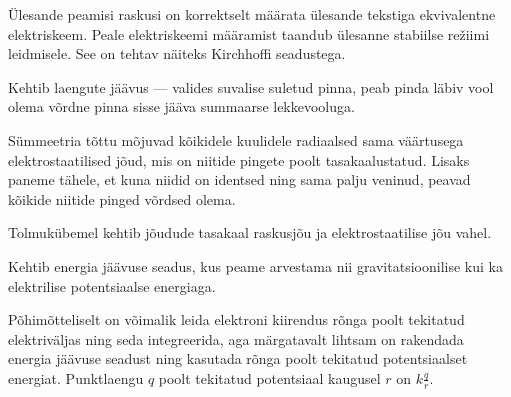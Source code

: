 \documentclass[10pt, twoside]{article}
\begin{document}
{%

\hint
Ülesande peamisi raskusi on korrektselt määrata ülesande tekstiga ekvivalentne elektriskeem. Peale elektriskeemi määramist taandub ülesanne stabiilse režiimi leidmisele. See on tehtav näiteks Kirchhoffi seadustega.
\probend
\bigskip


\hint
Kehtib laengute jäävus --- valides suvalise suletud pinna, peab pinda läbiv vool olema võrdne pinna sisse jääva summaarse lekkevooluga.
\probend
\bigskip


\hint
Sümmeetria tõttu mõjuvad kõikidele kuulidele radiaalsed sama väärtusega elektrostaatilised jõud, mis on niitide pingete poolt tasakaalustatud. Lisaks paneme tähele, et kuna niidid on identsed ning sama palju veninud, peavad kõikide niitide pinged võrdsed olema.
\probend
\bigskip


\hint
Tolmukübemel kehtib jõudude tasakaal raskusjõu ja elektrostaatilise jõu vahel.
\probend
\bigskip


\hint
Kehtib energia jäävuse seadus, kus peame arvestama nii gravitatsioonilise kui ka elektrilise potentsiaalse energiaga.
\probend
\bigskip


\hint
Põhimõtteliselt on võimalik leida elektroni kiirendus rõnga poolt tekitatud elektriväljas ning seda integreerida, aga märgatavalt lihtsam on rakendada energia jäävuse seadust ning kasutada rõnga poolt tekitatud potentsiaalset energiat. Punktlaengu $q$ poolt tekitatud potentsiaal kaugusel $r$ on $k\frac{q}{r}$.
\probend
\bigskip

}
\end{document}

